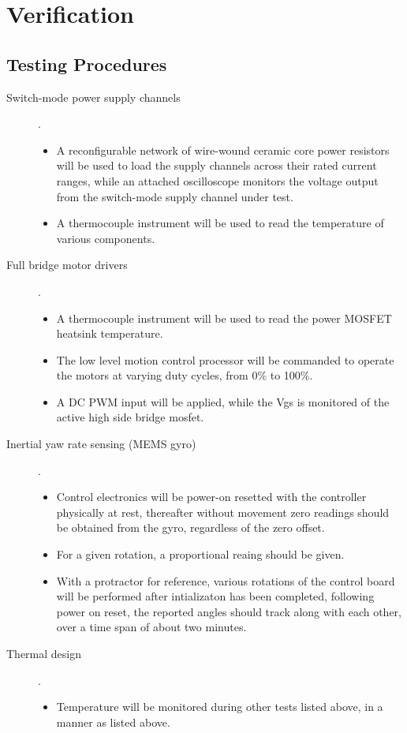 \documentclass[12pt]{article}
\begin{document}
 \section{Verification}
 \subsection{Testing Procedures}
 \begin{description}
    \item[Switch-mode power supply channels]. 
    \begin{itemize}
      \item A reconfigurable network of wire-wound ceramic core power resistors will be used to load the supply channels across their rated current ranges, while an attached oscilloscope monitors the voltage output from the switch-mode supply channel under test.
      \item A thermocouple instrument will be used to read the temperature of various components.
      \end{itemize}
    \item[Full bridge motor drivers]. 
    \begin{itemize}
      \item A thermocouple instrument will be used to read the power MOSFET heatsink temperature.
      \item The low level motion control processor will be commanded to operate the motors at varying duty cycles, from 0\% to 100\%.
      \item A DC PWM input will be applied, while the Vgs is monitored of the active high side bridge mosfet.
      \end{itemize}
    \item[Inertial yaw rate sensing (MEMS gyro)]. 
    \begin{itemize}
      \item Control electronics will be power-on resetted with the controller physically at rest, thereafter without movement zero readings should be obtained from the gyro, regardless of the zero offset.
      \item For a given rotation, a proportional reaing should be given.
      \item With a protractor for reference, various rotations of the control board will be performed after intializaton has been completed, following power on reset, the reported angles should track along with each other, over a time span of about two minutes.
      \end{itemize}
    \item[Thermal design]. 
    \begin{itemize}
     \item Temperature will be monitored during other tests listed above, in a manner as listed above.
      \end{itemize}
      \end{description}
\end{document}
